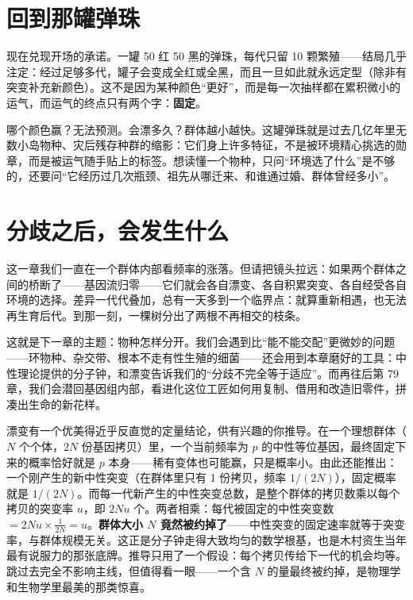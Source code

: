 \section{回到那罐弹珠}

现在兑现开场的承诺。一罐 50 红 50 黑的弹珠，每代只留 10 颗繁殖——结局几乎注定：经过足够多代，罐子会变成全红或全黑，而且一旦如此就永远定型（除非有突变补充新颜色）。这不是因为某种颜色“更好”，而是每一次抽样都在累积微小的运气，而运气的终点只有两个字：\textbf{固定}。

哪个颜色赢？无法预测。会漂多久？群体越小越快。这罐弹珠就是过去几亿年里无数小岛物种、灾后残存种群的缩影：它们身上许多特征，不是被环境精心挑选的勋章，而是被运气随手贴上的标签。想读懂一个物种，只问“环境选了什么”是不够的，还要问“它经历过几次瓶颈、祖先从哪迁来、和谁通过婚、群体曾经多小”。

\section{分歧之后，会发生什么}

这一章我们一直在一个群体内部看频率的涨落。但请把镜头拉远：如果两个群体之间的桥断了——基因流归零——它们就会各自漂变、各自积累突变、各自经受各自环境的选择。差异一代代叠加，总有一天多到一个临界点：就算重新相遇，也无法再生育后代。到那一刻，一棵树分出了两根不再相交的枝条。

这就是下一章的主题：物种怎样分开。我们会遇到比“能不能交配”更微妙的问题——环物种、杂交带、根本不走有性生殖的细菌——还会用到本章磨好的工具：中性理论提供的分子钟，和漂变告诉我们的“分歧不完全等于适应”。而再往后第 79 章，我们会潜回基因组内部，看进化这位工匠如何用复制、借用和改造旧零件，拼凑出生命的新花样。

\begin{tiaozhan}
漂变有一个优美得近乎反直觉的定量结论，供有兴趣的你推导。在一个理想群体（$N$ 个个体，$2N$ 份基因拷贝）里，一个当前频率为 $p$ 的中性等位基因，最终固定下来的概率恰好就是 $p$ 本身——稀有变体也可能赢，只是概率小。由此还能推出：一个刚产生的新中性突变（在群体里只有 1 份拷贝，频率 $1/(2N)$），固定概率就是 $1/(2N)$。而每一代新产生的中性突变总数，是整个群体的拷贝数乘以每个拷贝的突变率 $u$，即 $2Nu$ 个。两者相乘：每代被固定的中性突变数 $= 2Nu \times \frac{1}{2N} = u$。\textbf{群体大小 $N$ 竟然被约掉了}——中性突变的固定速率就等于突变率，与群体规模无关。这正是分子钟走得大致均匀的数学根基，也是木村资生当年最有说服力的那张底牌。推导只用了一个假设：每个拷贝传给下一代的机会均等。跳过去完全不影响主线，但值得看一眼——一个含 $N$ 的量最终被约掉，是物理学和生物学里最美的那类惊喜。
\end{tiaozhan}

